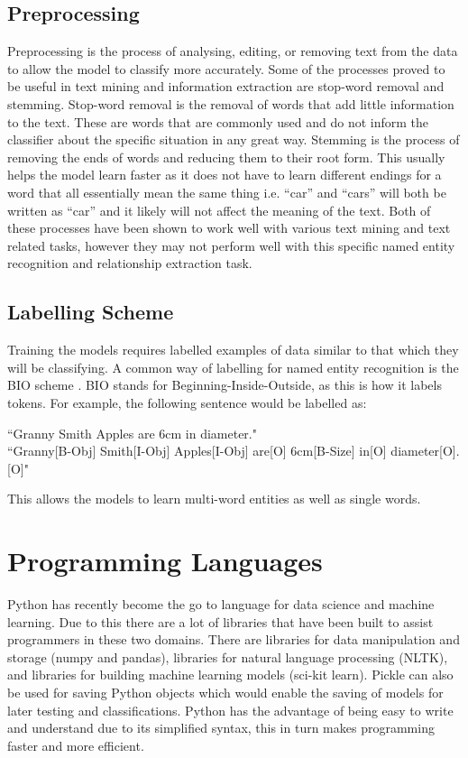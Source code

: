 \documentclass[11pt,oneside]{book}
\begin{document}
\subsection{Preprocessing}
Preprocessing is the process of analysing, editing, or removing text from the data to allow the model to classify more accurately. Some of the processes proved to be useful in text mining and information extraction \citep{preprocessing} are stop-word removal and stemming. Stop-word removal is the removal of words that add little information to the text. These are words that are commonly used and do not inform the classifier about the specific situation in any great way. Stemming is the process of removing the ends of words and reducing them to their root form. This usually helps the model learn faster as it does not have to learn different endings for a word that all essentially mean the same thing i.e. “car” and “cars” will both be written as “car” and it likely will not affect the meaning of the text. Both of these processes have been shown to work well with various text mining and text related tasks, however they may not perform well with this specific named entity recognition and relationship extraction task. 

\subsection{Labelling Scheme}
Training the models requires labelled examples of data similar to that which they will be classifying. A common way of labelling for named entity recognition is the BIO scheme \citep{bio}. BIO stands for Beginning-Inside-Outside, as this is how it labels tokens. For example, the following sentence would be labelled as:

\begin{displayquote}
“Granny Smith Apples are 6cm in diameter." \\
“Granny[B-Obj] Smith[I-Obj] Apples[I-Obj] are[O] 6cm[B-Size] in[O] diameter[O].[O]"
\end{displayquote}

\noindent This allows the models to learn multi-word entities as well as single words.

\section{Programming Languages}
Python has recently become the go to language for data science and machine learning. Due to this there are a lot of libraries that have been built to assist programmers in these two domains. There are libraries for data manipulation and storage (numpy and pandas), libraries for natural language processing (NLTK), and libraries for building machine learning models (sci-kit learn). Pickle can also be used for saving Python objects which would enable the saving of models for later testing and classifications. Python has the advantage of being easy to write and understand due to its simplified syntax, this in turn makes programming faster and more efficient.
\end{document}
